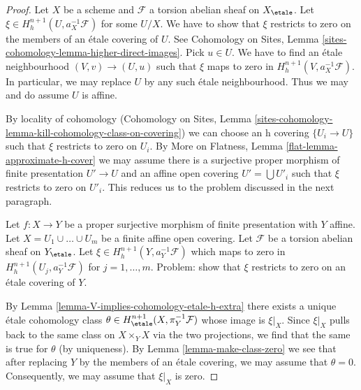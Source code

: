 \begin{proof}
Let $X$ be a scheme and $\mathcal{F}$ a torsion abelian sheaf on $X_\etale$.
Let $\xi \in H^{n + 1}_h(U, a_X^{-1}\mathcal{F})$ for some $U/X$.
We have to show that $\xi$ restricts to zero on the members of an
\'etale covering of $U$. See Cohomology on Sites,
Lemma \ref{sites-cohomology-lemma-higher-direct-images}.
Pick $u \in U$. We have to find an \'etale neighbourhood
$(V, v) \to (U, u)$
such that $\xi$ maps to zero in $H^{n + 1}_h(V, a_X^{-1}\mathcal{F})$.
In particular, we may replace $U$ by any such \'etale neighbourhood.
Thus we may and do assume $U$ is affine.

\medskip\noindent
By locality of cohomology (Cohomology on Sites, Lemma
\ref{sites-cohomology-lemma-kill-cohomology-class-on-covering})
we can choose an h covering $\{U_i \to U\}$
such that $\xi$ restricts to zero on $U_i$.
By More on Flatness, Lemma \ref{flat-lemma-approximate-h-cover}
we may assume there is a surjective proper morphism of finite presentation
$U' \to U$ and an affine open covering $U' = \bigcup U'_i$
such that $\xi$ restricts to zero on $U'_i$. This reduces us to the
problem discussed in the next paragraph.

\medskip\noindent
Let $f : X \to Y$ be a proper surjective morphism of finite presentation
with $Y$ affine. Let $X = U_1 \cup \ldots \cup U_m$ be a finite affine open
covering. Let $\mathcal{F}$ be a torsion abelian sheaf on $Y_\etale$.
Let $\xi \in H^{n + 1}_h(Y, a_Y^{-1}\mathcal{F})$
which maps to zero in $H^{n + 1}_h(U_j, a_Y^{-1}\mathcal{F})$
for $j = 1, \ldots, m$.
Problem: show that $\xi$ restricts to zero on an \'etale covering of $Y$.

\medskip\noindent
By Lemma \ref{lemma-V-implies-cohomology-etale-h-extra} there exists a
unique \'etale cohomology class
$\theta \in H^{n + 1}_\etale(X, \pi_Y^{-1}\mathcal{F})$
whose image is $\xi|_X$.
Since $\xi|_X$ pulls back to the same class on $X \times_Y X$
via the two projections, we find that the same is true for $\theta$
(by uniqueness).
By Lemma \ref{lemma-make-class-zero}
we see that after replacing $Y$ by the members of an \'etale covering,
we may assume that $\theta = 0$.
Consequently, we may assume that $\xi|_X$ is zero.


\end{proof}

